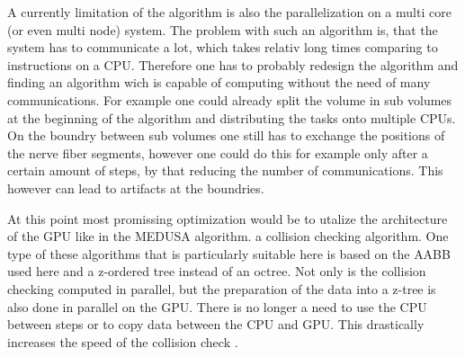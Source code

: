 \par
% 
A currently limitation of the algorithm is also the parallelization on a multi core (or even multi node) system.
The problem with such an algorithm is, that the system has to communicate a lot, which takes relativ long times comparing to instructions on a \ac{CPU}.
Therefore one has to probably redesign the algorithm and finding an algorithm wich is capable of computing without the need of many communications.
For example one could already split the volume in sub volumes at the beginning of the algorithm and distributing the tasks onto multiple \acp{CPU}.
On the boundry between sub volumes one still has to exchange the positions of the nerve fiber segments, however one could do this for example only after a certain amount of steps, by that reducing the number of communications.
This however can lead to artifacts at the boundries.
\par
% 
At this point most promissing optimization would be to utalize the architecture of the \ac{GPU} like in the \ac{MEDUSA} algorithm.
a collision checking algorithm.
One type of these algorithms that is particularly suitable here is based on the \ac{AABB} used here and a z-ordered tree instead of an octree.
Not only is the collision checking computed in parallel, but the preparation of the data into a z-tree is also done in parallel on the \ac{GPU}.
There is no longer a need to use the \ac{CPU} between steps or to copy data between the \ac{CPU} and \ac{GPU}.
This drastically increases the speed of the collision check \cite{Karras2012}. 
% 
% 
% 
